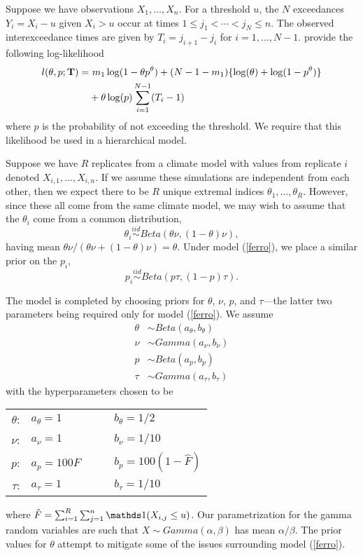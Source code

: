 Suppose we have observations $X_1,\ldots,X_n$. For a threshold $u$, the $N$ exceedances $Y_i=X_i-u$ given $X_i>u$ occur at times $1\leq j_1<\cdots< j_N\leq n$. The observed interexceedance times are given by $T_i=j_{i+1}-j_i$ for $i=1,\ldots,N-1$. \cite{ferro2003inference} provide the following log-likelihood
\begin{align}
l(\theta, p; \mathbf{\bm{T}}) =&~ m_1\log(1-\theta p^\theta) + (N-1-m_1)\{\log(\theta)+ \log(1-p^\theta)\} \nonumber \\
 &+ \theta\log(p)\sum_{i=1}^{N-1}(T_i-1) \label{ferro}
\end{align}
where $p$ is the probability of not exceeding the threshold. We require that this likelihood be used in a hierarchical model.

Suppose we have $R$ replicates from a climate model with values from replicate $i$ denoted $X_{i,1},\ldots,X_{i,n}$. If we assume these simulations are independent from each other, then we expect there to be $R$ unique extremal indices $\theta_1,\ldots,\theta_R$. However, since these all come from the same climate model, we may wish to assume that the $\theta_i$ come from a common distribution,  
\[ \theta_i \overset{iid}\sim Beta\left(\theta\nu, (1-\theta)\nu\right), \]    
having mean $\theta\nu /(\theta\nu + (1-\theta)\nu) = \theta$. Under model (\ref{ferro}), we place a similar prior on the $p_i$,   
\[ p_i \overset{iid}\sim Beta\left(p\tau, (1-p)\tau\right). \] 
   
The model is completed by choosing priors for $\theta$, $\nu$, $p$, and $\tau$---the latter two parameters being required only for model (\ref{ferro}). We assume  
\begin{align*} 
\theta &\sim Beta(a_\theta, b_\theta) \\   
\nu &\sim Gamma(a_\nu, b_\nu) \\   
p &\sim Beta(a_p, b_p) \\  
\tau &\sim Gamma(a_\tau, b_\tau)   
\end{align*}   
with the hyperparameters chosen to be  
\begin{center} 
\begin{tabular}{rlcl}  
$\theta$: & $a_\theta = 1          $ &~~& $b_\theta = 1/2             $ \\ 
$   \nu$: & $   a_\nu = 1          $ &~~& $   b_\nu = 1/10            $ \\ 
$     p$: & $     a_p = 100 \hat{F}$ &~~& $     b_p = 100 (1-\hat{F}) $ \\ 
$  \tau$: & $  a_\tau = 1          $ &~~& $  b_\tau = 1/10            $ \\ 
\end{tabular}  
\end{center}   
where $\hat{F}=\sum_{i=1}^R\sum_{j=1}^n \ind(X_{i,j}\leq u)$. Our parametrization for the gamma random variables are such that $X\sim Gamma(\alpha,\beta)$ has mean $\alpha/\beta$. The prior values for $\theta$ attempt to mitigate some of the issues surrounding model (\ref{ferro}).  
   
